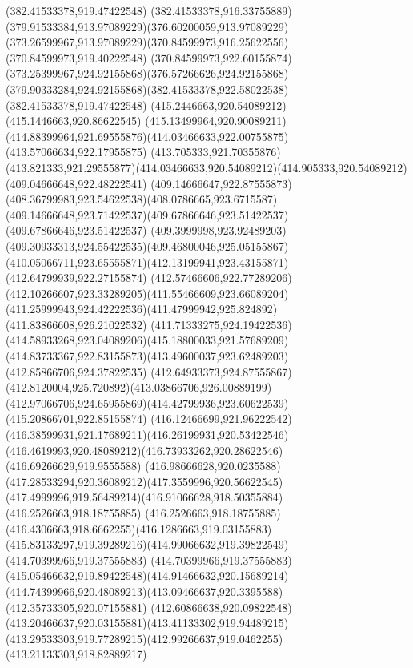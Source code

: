 {{{{				\moveto(382.41533378,919.47422548)
				\curveto(382.41533378,916.33755889)(379.91533384,913.97089229)(376.60200059,913.97089229)
				\curveto(373.26599967,913.97089229)(370.84599973,916.25622556)(370.84599973,919.40222548)
				\curveto(370.84599973,922.60155874)(373.25399967,924.92155868)(376.57266626,924.92155868)
				\curveto(379.90333284,924.92155868)(382.41533378,922.58022538)(382.41533378,919.47422548)
				\moveto(415.2446663,920.54089212)
				\lineto(415.1446663,920.86622545)
				\curveto(415.13499964,920.90089211)(414.88399964,921.69555876)(414.03466633,922.00755875)
				\lineto(413.57066634,922.17955875)
				\lineto(413.705333,921.70355876)
				\curveto(413.821333,921.29555877)(414.03466633,920.54089212)(414.905333,920.54089212)
				\closepath
				\moveto(409.04666648,922.48222541)
				\curveto(409.14666647,922.87555873)(408.36799983,923.54622538)(408.0786665,923.6715587)
				\curveto(409.14666648,923.71422537)(409.67866646,923.51422537)(409.67866646,923.51422537)
				\curveto(409.3999998,923.92489203)(409.30933313,924.55422535)(409.46800046,925.05155867)
				\curveto(410.05066711,923.65555871)(412.13199941,923.43155871)(412.64799939,922.27155874)
				\curveto(412.57466606,922.77289206)(412.10266607,923.33289205)(411.55466609,923.66089204)
				\curveto(411.25999943,924.42222536)(411.47999942,925.824892)(411.83866608,926.21022532)
				\curveto(411.71333275,924.19422536)(414.58933268,923.04089206)(415.18800033,921.57689209)
				\curveto(414.83733367,922.83155873)(413.49600037,923.62489203)(412.85866706,924.37822535)
				\curveto(412.64933373,924.87555867)(412.8120004,925.720892)(413.03866706,926.00889199)
				\curveto(412.97066706,924.65955869)(414.42799936,923.60622539)(415.20866701,922.85155874)
				\curveto(416.12466699,921.96222542)(416.38599931,921.17689211)(416.26199931,920.53422546)
				\curveto(416.4619993,920.48089212)(416.73933262,920.28622546)(416.69266629,919.9555588)
				\curveto(416.98666628,920.0235588)(417.28533294,920.36089212)(417.3559996,920.56622545)
				\curveto(417.4999996,919.56489214)(416.91066628,918.50355884)(416.2526663,918.18755885)
				\curveto(416.2526663,918.18755885)(416.4306663,918.6662255)(416.1286663,919.03155883)
				\curveto(415.83133297,919.39289216)(414.99066632,919.39822549)(414.70399966,919.37555883)
				\curveto(414.70399966,919.37555883)(415.05466632,919.89422548)(414.91466632,920.15689214)
				\curveto(414.74399966,920.48089213)(413.09466637,920.3395588)(412.35733305,920.07155881)
				\curveto(412.60866638,920.09822548)(413.20466637,920.03155881)(413.41133302,919.94489215)
				\curveto(413.29533303,919.77289215)(412.99266637,919.0462255)(413.21133303,918.82889217)
}}}}
